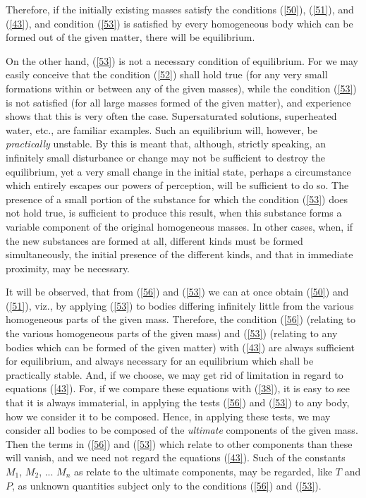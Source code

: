 \documentclass[12pt]{article}
\begin{document}
Therefore, if the initially existing masses satisfy the conditions (\ref{50}),
(\ref{51}), and (\ref{43}), and condition (\ref{53}) is satisfied by every homogeneous body which can be formed out of the given matter, there will be equilibrium.


On the other hand, (\ref{53}) is not a necessary condition of equilibrium.
For we may easily conceive that the condition (\ref{52}) shall hold true (for any very small formations within or between any of the given masses), while the condition (\ref{53}) is not satisfied (for all large masses formed of the given matter), and experience shows that this is very often the case. Supersaturated solutions, superheated water, etc., are familiar examples. Such an equilibrium will, however, be \textit{practically} unstable. By this is meant that, although, strictly speaking, an infinitely small disturbance or change may not be sufficient to destroy the equilibrium, yet a very small change in the initial state, perhaps a circumstance which entirely escapes our powers of perception, will be sufficient to do so. The presence of a small portion of the substance for which the condition (\ref{53}) does not hold true, is sufficient to produce this result, when this substance forms a variable component of the original homogeneous masses. In other cases, when, if the new substances are formed at all, different kinds must be formed simultaneously, the initial presence of the different kinds, and that in immediate proximity, may be necessary.


It will be observed, that from (\ref{56}) and (\ref{53}) we can at once obtain (\ref{50}) and (\ref{51}), viz., by applying (\ref{53}) to bodies differing infinitely little from the various homogeneous parts of the given mass. Therefore, the condition (\ref{56}) (relating to the various homogeneous parts of the given mass) and (\ref{53}) (relating to any bodies which can be formed of the given matter) with (\ref{43}) are always sufficient for equilibrium, and always necessary for an equilibrium which shall be practically stable. And, if we choose, we may get rid of limitation in regard to equations (\ref{43}). For, if we compare these equations with (\ref{38}), it is easy to see that it is always immaterial, in applying the tests (\ref{56}) and (\ref{53}) to any body, how we consider it to be composed. Hence, in applying these tests, we may consider all bodies to be composed of the \textit{ultimate} components of the given mass. Then the terms in (\ref{56}) and (\ref{53}) which relate to other components than these will vanish, and we need not regard the equations (\ref{43}). Such of the constants $M_1$, $M_2$, ... $M_n$ as relate to the ultimate components, may be regarded, like $T$ and $P$, as unknown quantities subject only to the conditions (\ref{56}) and (\ref{53}).
\end{document}
